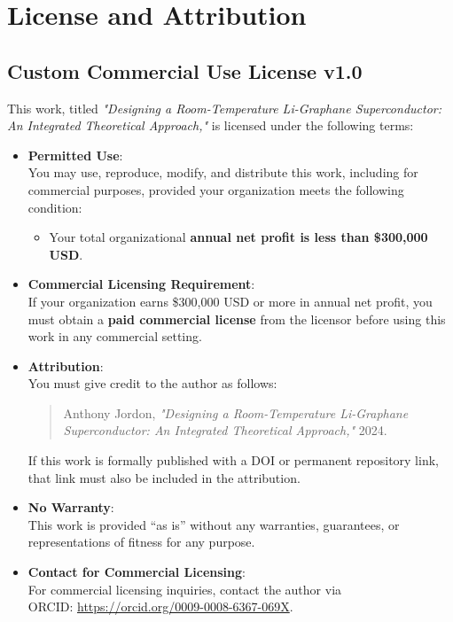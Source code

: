 \documentclass[11pt,a4paper]{article}
\begin{document}
\section*{License and Attribution}
\label{sec:custom_license}

\subsection*{Custom Commercial Use License v1.0}

This work, titled \textit{"Designing a Room-Temperature Li-Graphane Superconductor: An Integrated Theoretical Approach,"} is licensed under the following terms:

\begin{itemize}
    \item \textbf{Permitted Use}: \\
    You may use, reproduce, modify, and distribute this work, including for commercial purposes, provided your organization meets the following condition:
    \begin{itemize}
        \item Your total organizational \textbf{annual net profit is less than \$300{,}000 USD}.
    \end{itemize}

    \item \textbf{Commercial Licensing Requirement}: \\
    If your organization earns \$300{,}000 USD or more in annual net profit, you must obtain a \textbf{paid commercial license} from the licensor before using this work in any commercial setting.

    \item \textbf{Attribution}: \\
    You must give credit to the author as follows: 
    \begin{quote}
    Anthony Jordon, \textit{"Designing a Room-Temperature Li-Graphane Superconductor: An Integrated Theoretical Approach,"} 2024.
    \end{quote}
    If this work is formally published with a DOI or permanent repository link, that link must also be included in the attribution.

    \item \textbf{No Warranty}: \\
    This work is provided “as is” without any warranties, guarantees, or representations of fitness for any purpose.

    \item \textbf{Contact for Commercial Licensing}: \\
    For commercial licensing inquiries, contact the author via \\ORCID: \url{https://orcid.org/0009-0008-6367-069X}.
\end{itemize}
\end{document}
